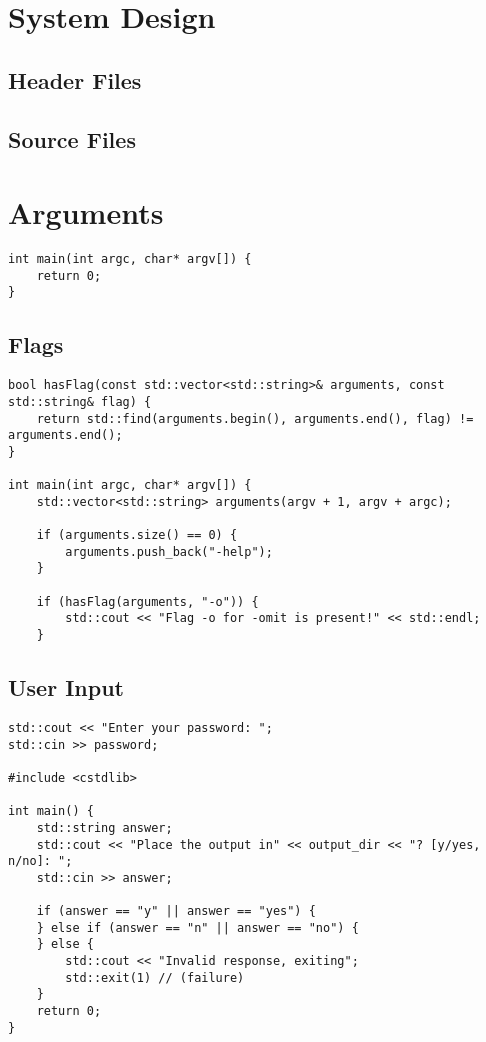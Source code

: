 \documentclass[openany]{report}
\begin{document}
\section{System Design}

\subsection{Header Files}

\subsection{Source Files}

\section{Arguments}

\begin{verbatim}
int main(int argc, char* argv[]) {
    return 0;
}
\end{verbatim}

\subsection{Flags}

\begin{verbatim}
bool hasFlag(const std::vector<std::string>& arguments, const std::string& flag) {
    return std::find(arguments.begin(), arguments.end(), flag) != arguments.end();
}

int main(int argc, char* argv[]) {
    std::vector<std::string> arguments(argv + 1, argv + argc);

    if (arguments.size() == 0) {
        arguments.push_back("-help");
    }

    if (hasFlag(arguments, "-o")) {
        std::cout << "Flag -o for -omit is present!" << std::endl;
    }
\end{verbatim}

\subsection{User Input}

\begin{verbatim}
std::cout << "Enter your password: ";
std::cin >> password;

#include <cstdlib>

int main() {
    std::string answer;
    std::cout << "Place the output in" << output_dir << "? [y/yes, n/no]: ";
    std::cin >> answer;

    if (answer == "y" || answer == "yes") {
    } else if (answer == "n" || answer == "no") {
    } else {
        std::cout << "Invalid response, exiting";
        std::exit(1) // (failure)
    }
    return 0;
}
\end{verbatim}
\end{document}
